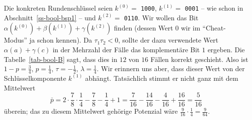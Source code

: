 \begin{refsegment}
Die konkreten Rundenschlüssel seien
$k^{(0)} =$ \verb:1000:, $k^{(1)} =$ \verb:0001: -- wie
schon in Abschnitt~\ref{ss-bool-bsp1} -- und $k^{(2)} =$ \verb:0110:. Wir wollen
das Bit $\alpha(k^{(0)}) + \beta(k^{(1)}) + \gamma(k^{(2)})$ finden (dessen Wert
$0$ wir im "`Cheat-Modus"' ja schon kennen). Da $\tau_1 \tau_2 < 0$,
sollte der dazu verwendete Wert $\alpha(a) + \gamma(c)$ in der
Mehrzahl der Fälle das komplementäre Bit $1$ ergeben. Die
Tabelle~\ref{tab-bool-B} sagt, dass dies in $12$ von $16$ Fällen
korrekt geschieht. Also ist $1 - p = \frac{3}{4}$, $p = \frac{1}{4}$,
$\tau = -\frac{1}{2}$,
$\lambda =  \frac{1}{4}$. Wir erinnern uns aber, dass dieser Wert
von der Schlüsselkomponente $k^{(1)}$ abhängt. Tatsächlich stimmt er
nicht ganz mit dem Mittelwert
\[
    \bar{p} =
      2 \cdot \frac{7}{8} \cdot \frac{1}{4} - \frac{7}{8} - \frac{1}{4} +1
      =  \frac{7}{16} - \frac{14}{16} - \frac{4}{16} + \frac{16}{16}
      = \frac{5}{16}
\]
überein; das zu diesem Mittelwert gehörige Potenzial wäre
$\frac{9}{16} \cdot \frac{1}{4} = \frac{9}{64}$.


\end{refsegment}
